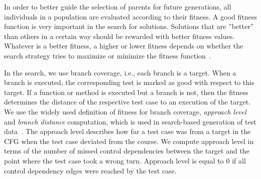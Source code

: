 \documentclass[paper=a4,%
  twoside,%
  BCOR4mm,%
  abstract=true,%
  toc=bibliography,%
  chapterprefix=true,%
  toc=bibliographynumbered,%
  open=right,%
  english,%
  pagesize=pdftex]{scrreprt}
\newcommand{\cfg}{\ac{CFG}\xspace}
\begin{document}
In order to better guide the selection of parents for future generations, all individuals in a population are evaluated according to their fitness. A good fitness function is very important in the search for solutions. Solutions that are ''better'' than others in a certain way should be rewarded with better fitness values. Whatever is a better fitness, a higher or lower fitness depends on whether the search strategy tries to maximize or minimize the fitness function~\cite{McMinn_2004}.



In the search, we use branch coverage, i.e., each branch is a target. When a branch is executed, the corresponding test is marked as good with respect to this target. If a function or method is executed but a branch is not, then the fitness determines the distance of the respective test case to an execution of the target. We use the widely used definition of fitness for branch coverage, \textit{approach level} and \textit{branch distance} computation, which is used in search-based generation of test data~\cite{McMinn_2004}. The approach level describes how far a test case was from a target in the \cfg when the test case deviated from the course. We compute approach level in terms of the number of missed control dependencies between the target and the point where the test case took a wrong turn. Approach level is equal to $0$ if all control dependency edges were reached by the test case.
\end{document}
